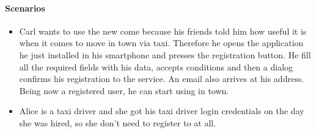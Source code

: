 \paragraph{Scenarios}
\begin{itemize}
	\item Carl wants to use the new come \myTaxiService{} because his friends told him how useful it is when it comes to move in town via taxi.
	Therefore he opens the \myTaxiService{} application he just installed in his smartphone and presses the registration button.
	He fill all the required fields with his data, accepts \myTaxiService{} conditions and then a dialog confirms his registration to the service.
	An email also arrives at his address.
	Being now a registered user, he can start using \myTaxiService{} in town.
	\item Alice is a taxi driver and she got his taxi driver login credentials on the day she was hired, so she don't need to register to \myTaxiService{} at all.
\end{itemize}
